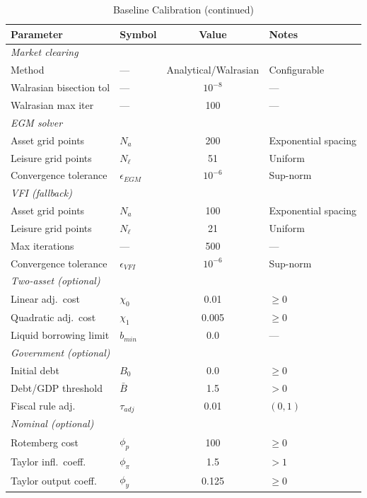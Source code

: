 \documentclass[12pt]{article}
\begin{document}
\begin{table}[tp]
\centering
\caption{Baseline Calibration (continued)}\label{tab:calibration2}
\small
\begin{tabular}{@{}llcl@{}}
\toprule
\textbf{Parameter} & \textbf{Symbol} & \textbf{Value} & \textbf{Notes} \\
\midrule
\multicolumn{4}{l}{\textit{Market clearing}} \\
Method & --- & Analytical/Walrasian & Configurable \\
Walrasian bisection tol & --- & $10^{-8}$ & --- \\
Walrasian max iter & --- & 100 & --- \\
\midrule
\multicolumn{4}{l}{\textit{EGM solver}} \\
Asset grid points & $N_a$ & 200 & Exponential spacing \\
Leisure grid points & $N_\ell$ & 51 & Uniform \\
Convergence tolerance & $\epsilon_{EGM}$ & $10^{-6}$ & Sup-norm \\
\midrule
\multicolumn{4}{l}{\textit{VFI (fallback)}} \\
Asset grid points & $N_a$ & 100 & Exponential spacing \\
Leisure grid points & $N_\ell$ & 21 & Uniform \\
Max iterations & --- & 500 & --- \\
Convergence tolerance & $\epsilon_{VFI}$ & $10^{-6}$ & Sup-norm \\
\midrule
\multicolumn{4}{l}{\textit{Two-asset (optional)}} \\
Linear adj.\ cost & $\chi_0$ & 0.01 & $\geq 0$ \\
Quadratic adj.\ cost & $\chi_1$ & 0.005 & $\geq 0$ \\
Liquid borrowing limit & $b_{min}$ & 0.0 & --- \\
\midrule
\multicolumn{4}{l}{\textit{Government (optional)}} \\
Initial debt & $B_0$ & 0.0 & $\geq 0$ \\
Debt/GDP threshold & $\bar{B}$ & 1.5 & $> 0$ \\
Fiscal rule adj. & $\tau_{adj}$ & 0.01 & $(0, 1)$ \\
\midrule
\multicolumn{4}{l}{\textit{Nominal (optional)}} \\
Rotemberg cost & $\phi_p$ & 100 & $\geq 0$ \\
Taylor infl.\ coeff. & $\phi_\pi$ & 1.5 & $> 1$ \\
Taylor output coeff. & $\phi_y$ & 0.125 & $\geq 0$ \\

\end{tabular}
\end{table}
\end{document}
